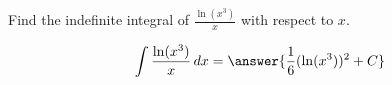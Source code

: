 \documentclass{ximera}
\author{Gregory Hartman \and Matthew Carr}
\begin{document}
\begin{exercise}

Find the indefinite integral of $\frac{\ln(x^3)}{x}$ with respect to $x$.

\[
\int \frac{\ln(x^3)}{x}\d x=\answer{\frac{1}{6}(\ln(x^3))^2+C}
\]

\end{exercise}
\end{document}
